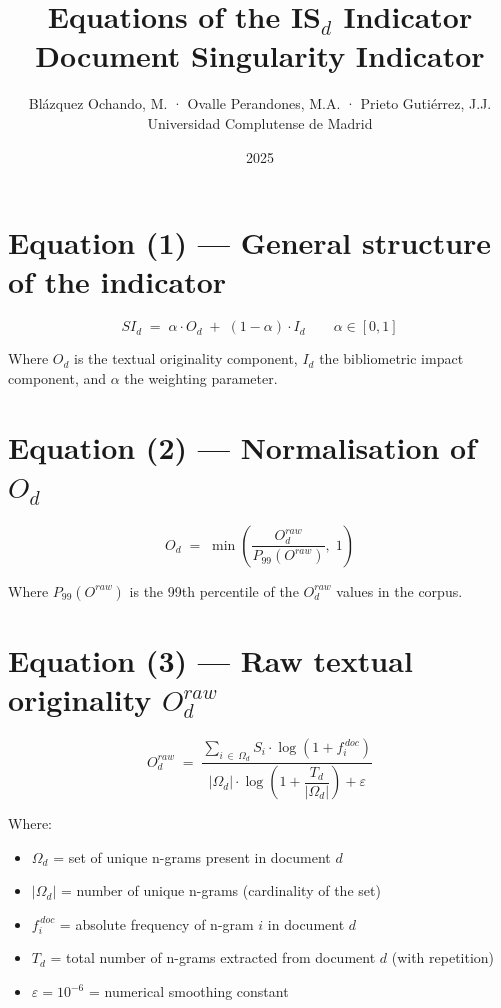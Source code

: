 \documentclass[12pt]{article}
\title{Equations of the IS$_d$ Indicator\\
\large Document Singularity Indicator}
\author{Blázquez Ochando, M. · Ovalle Perandones, M.A. · Prieto Gutiérrez, J.J.\\
Universidad Complutense de Madrid}
\date{2025}
\begin{document}
\maketitle

\section*{Equation (1) — General structure of the indicator}

\begin{equation}
SI_d \;=\; \alpha \cdot O_d \;+\; (1-\alpha) \cdot I_d
\qquad \alpha \in [0,1]
\label{eq:isd}
\end{equation}

\noindent
Where $O_d$ is the textual originality component, $I_d$ the bibliometric
impact component, and $\alpha$ the weighting parameter.

\section*{Equation (2) — Normalisation of $O_d$}

\begin{equation}
O_d \;=\; \min\!\left(\frac{O_d^{raw}}{P_{99}(O^{raw})},\; 1\right)
\label{eq:od}
\end{equation}

\noindent
Where $P_{99}(O^{raw})$ is the 99th percentile of the $O_d^{raw}$ values
in the corpus.

\section*{Equation (3) — Raw textual originality $O_d^{raw}$}

\begin{equation}
O_d^{raw} \;=\;
\frac{\displaystyle\sum_{i \,\in\, \Omega_d} S_i \cdot \log\!\left(1 + f_i^{\,doc}\right)}
     {\;\left|\Omega_d\right| \cdot \log\!\!\left(1 + \dfrac{T_d}{\left|\Omega_d\right|}\right) + \varepsilon\;}
\label{eq:odraw}
\end{equation}

\noindent
Where:
\begin{itemize}
  \item $\Omega_d$ = set of unique n-grams present in document $d$
  \item $|\Omega_d|$ = number of unique n-grams (cardinality of the set)
  \item $f_i^{\,doc}$ = absolute frequency of n-gram $i$ in document $d$
  \item $T_d$ = total number of n-grams extracted from document $d$ (with repetition)
  \item $\varepsilon = 10^{-6}$ = numerical smoothing constant
\end{itemize}
\end{document}
